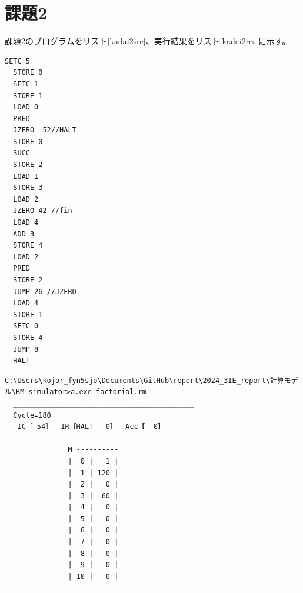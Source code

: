 \documentclass[a4paper,11pt]{ltjsarticle}
\begin{document}
\section{課題2}
課題2のプログラムをリスト\ref{kadai2src}、実行結果をリスト\ref{kadai2res}に示す。
\begin{lstlisting}[caption = 課題2のプログラム,label = kadai2src]
  SETC 5
  STORE 0
  SETC 1
  STORE 1
  LOAD 0
  PRED
  JZERO  52//HALT
  STORE 0
  SUCC
  STORE 2
  LOAD 1
  STORE 3
  LOAD 2
  JZERO 42 //fin
  LOAD 4
  ADD 3
  STORE 4
  LOAD 2
  PRED
  STORE 2
  JUMP 26 //JZERO
  LOAD 4
  STORE 1
  SETC 0
  STORE 4
  JUMP 8
  HALT
\end{lstlisting}
\begin{lstlisting}[caption = 課題2の実行結果,label = kadai2res]
  C:\Users\kojor_fyn5sjo\Documents\GitHub\report\2024_3IE_report\計算モデル\RM-simulator>a.exe factorial.rm
  ___________________________________________
  Cycle=180
   IC［ 54］  IR［HALT   0］  Acc【  0】
  ___________________________________________    
               M ----------
               |  0 |   1 |
               |  1 | 120 |
               |  2 |   0 |
               |  3 |  60 |
               |  4 |   0 |
               |  5 |   0 |
               |  6 |   0 |
               |  7 |   0 |
               |  8 |   0 |
               |  9 |   0 |
               | 10 |   0 |
               ------------
 
\end{lstlisting}
\end{document}
